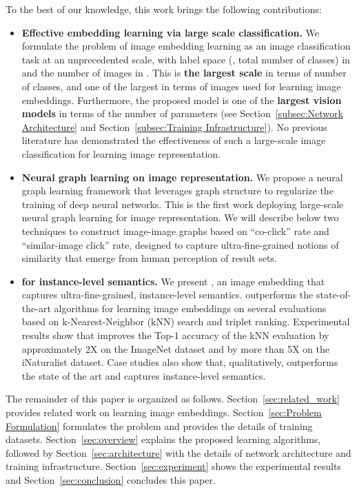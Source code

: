 \documentclass[sigconf]{acmart}
\begin{document}
To the best of our knowledge, this work brings the following contributions:
\begin{itemize}
    \item{{\bf Effective embedding learning via large scale classification.} We formulate the problem of image embedding learning as an image classification task at an unprecedented scale, with label space (\ie, total number of classes) in  and the number of images in . This is {\bf the largest scale} in terms of number of classes, and one of the largest in terms of images used for learning image embeddings. Furthermore, the proposed model is one of the {\bf largest vision models} in terms of the number of parameters (see Section~\ref{subsec:Network Architecture} and Section~\ref{subsec:Training Infrastructure}). No previous literature has demonstrated the effectiveness of such a large-scale image classification for learning image representation.}
    \item{{\bf Neural graph learning on image representation.} We propose a neural graph learning framework that leverages graph structure to regularize the training of deep neural networks. This is the first work deploying large-scale neural graph learning for image representation. We will describe below two techniques to construct image-image graphs based on ``co-click'' rate and ``similar-image click'' rate, designed to capture ultra-fine-grained notions of similarity that emerge from human perception of result sets.} 
\item{{\bf {\ourmodel} for instance-level semantics.} We present {\ourmodel}, an image embedding that captures ultra-fine-grained, instance-level semantics. {\ourmodel} outperforms the state-of-the-art algorithms for learning image embeddings on several evaluations based on k-Nearest-Neighbor (kNN) search and triplet ranking. Experimental results show that {\ourmodel} improves the Top-1 accuracy of the kNN evaluation by approximately 2X on the ImageNet dataset and by more than 5X on the iNaturalist dataset. Case studies also show that, qualitatively, {\ourmodel} outperforms the state of the art and captures instance-level semantics. }
\end{itemize}

The remainder of this paper is organized as follows. Section~\ref{sec:related_work} provides related work on learning image embeddings. Section~\ref{sec:Problem Formulation} formulates the problem and provides the details of training datasets. Section~\ref{sec:overview} explains the proposed learning algorithms, followed by Section~\ref{sec:architecture} with the details of network architecture and training infrastructure. Section~\ref{sec:experiment} shows the experimental results and Section~\ref{sec:conclusion} concludes this paper.
\end{document}

